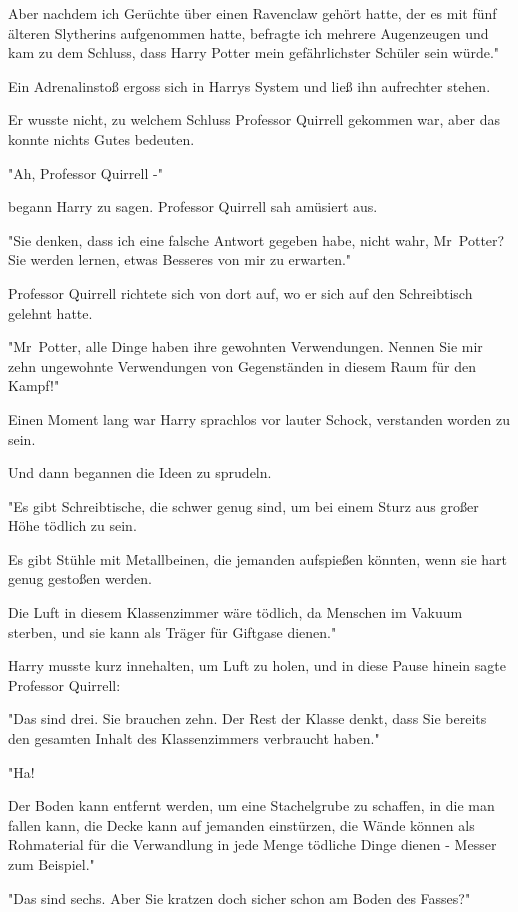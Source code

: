 {Aber nachdem ich Gerüchte über einen Ravenclaw gehört hatte, der es mit fünf älteren Slytherins aufgenommen hatte, befragte ich mehrere Augenzeugen und kam zu dem Schluss, dass Harry Potter mein gefährlichster Schüler sein würde."

Ein Adrenalinstoß ergoss sich in Harrys System und ließ ihn aufrechter stehen.

Er wusste nicht, zu welchem Schluss Professor Quirrell gekommen war, aber das konnte nichts Gutes bedeuten.

"Ah, Professor Quirrell -"

begann Harry zu sagen. Professor Quirrell sah amüsiert aus.

"Sie denken, dass ich eine falsche Antwort gegeben habe, nicht wahr, Mr~Potter? Sie werden lernen, etwas Besseres von mir zu erwarten."

Professor Quirrell richtete sich von dort auf, wo er sich auf den Schreibtisch gelehnt hatte.

"Mr~Potter, alle Dinge haben ihre gewohnten Verwendungen. Nennen Sie mir zehn ungewohnte Verwendungen von Gegenständen in diesem Raum für den Kampf!"

Einen Moment lang war Harry sprachlos vor lauter Schock, verstanden worden zu sein.

Und dann begannen die Ideen zu sprudeln.

"Es gibt Schreibtische, die schwer genug sind, um bei einem Sturz aus großer Höhe tödlich zu sein.

Es gibt Stühle mit Metallbeinen, die jemanden aufspießen könnten, wenn sie hart genug gestoßen werden.

Die Luft in diesem Klassenzimmer wäre tödlich, da Menschen im Vakuum sterben, und sie kann als Träger für Giftgase dienen."

Harry musste kurz innehalten, um Luft zu holen, und in diese Pause hinein sagte Professor Quirrell:

"Das sind drei. Sie brauchen zehn. Der Rest der Klasse denkt, dass Sie bereits den gesamten Inhalt des Klassenzimmers verbraucht haben."

"Ha!

Der Boden kann entfernt werden, um eine Stachelgrube zu schaffen, in die man fallen kann, die Decke kann auf jemanden einstürzen, die Wände können als Rohmaterial für die Verwandlung in jede Menge tödliche Dinge dienen - Messer zum Beispiel."

"Das sind sechs. Aber Sie kratzen doch sicher schon am Boden des Fasses?"

}
